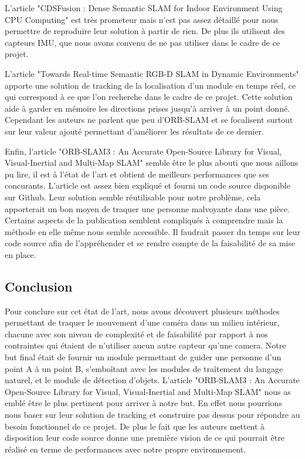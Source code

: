 \documentclass[11pt]{article}
\begin{document}
  L'article "CDSFusion : Dense Semantic SLAM for Indoor Environment Using CPU Computing" est très prometeur mais n'est pas assez détaillé 
  pour nous permettre de reproduire leur solution à partir de rien. De plus ils utilisent des capteurs IMU, que nous avons convenu de ne pas 
  utiliser dans le cadre de ce projet.

  L'article "Towards Real-time Semantic RGB-D SLAM in Dynamic Environments" apporte une solution de tracking de la localisation 
  d'un module en temps réel, ce qui correspond à ce que l'on recherche dans le cadre de ce projet. Cette solution aide à garder en 
  mémoire les directions prises jusqu'à arriver à un point donné. Cependant les auteurs ne parlent que peu d'ORB-SLAM et se focalisent 
  surtout sur leur valeur ajouté permettant d'améliorer les résultats de ce dernier.

  Enfin, l'article "ORB-SLAM3 : An Accurate Open-Source Library for Visual, Visual-Inertial and Multi-Map SLAM" semble être le plus abouti
  que nous aillons pu lire, il est à l'état de l'art et obtient de meilleurs performances que ses concurants. L'article est assez bien expliqué
  et fourni un code source disponible sur Github. Leur solution semble réutilisable pour notre problème, cela apporterait un bon moyen
  de traquer une personne malvoyante dans une pièce. Certains aspects de la publication semblent compliqués à comprendre mais la méthode en 
  elle même nous semble accessible. Il faudrait passer du temps sur leur code source afin de l'appréhender et se rendre compte de la faisabilité
  de sa mise en place.

  \pagebreak

  \subsection{Conclusion}
  Pour conclure sur cet état de l'art, nous avons découvert plusieurs méthodes permettant de traquer le mouvement d'une caméra dans un
  milieu intérieur, chacune avec son niveau de complexité et de faisabilité par rapport à nos contraintes qui étaient de n'utiliser aucun
  autre capteur qu'une camera. Notre but final était de fournir un module permettant de guider une personne d'un point A à un point B, 
  s'emboîtant avec les modules de traîtement du langage naturel, et le module de détection d'objets. L'article "ORB-SLAM3 : An Accurate 
  Open-Source Library for Visual, Visual-Inertial and Multi-Map SLAM" nous as emblé être le plus pertinent pour arriver à notre but. 
  En effet nous pourrions nous baser sur leur solution de tracking et construire pas dessus pour répondre au besoin fonctionnel de ce projet.
  De plus le fait que les auteurs mettent à disposition leur code source donne une première vision de ce qui pourrait être réalisé en terme de 
  performances avec notre propre environnement.
\end{document}
